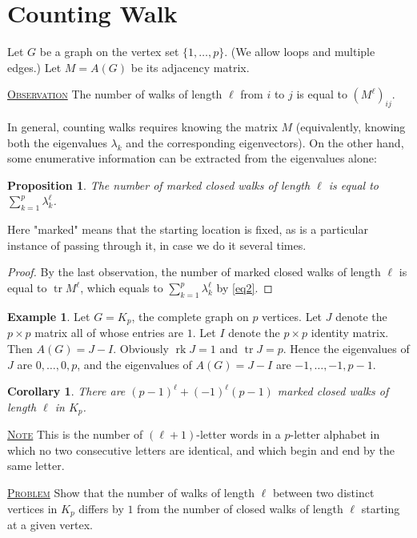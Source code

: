 \documentclass{report}
\def \tr {\operatorname{tr}}
\def \rk {\operatorname{rk}}
\newcommand{\fancyem}[1]{\underline{\textsc{#1}}}
\newtheorem{corollary}{Corollary}[section]
\newtheorem{proposition}{Proposition}[section]
\theoremstyle{definition}
\newtheorem{example}{Example}[section]
\theoremstyle{remark}
\numberwithin{equation}{section}
\begin{document}
\section{Counting Walk}
Let $G$ be a graph on the vertex set $\{1, \ldots, p\}$. (We allow loops and multiple edges.) Let $M = A(G)$ be its adjacency matrix.

\fancyem{Observation} The number of walks of length $\ell$ from $i$ to $j$ is equal to $(M^\ell)_{ij}$.

In general, counting walks requires knowing the matrix $M$ (equivalently, knowing both the eigenvalues $\lambda_k$ and the corresponding eigenvectors). On the other hand, some enumerative information can be extracted from the eigenvalues alone:

\begin{proposition}
The number of marked closed walks of length $\ell$ is equal to $\sum_{k=1}^p \lambda^\ell_k$.
\end{proposition}
Here "marked" means that the starting location is fixed, as is a particular instance
of passing through it, in case we do it several times.

\begin{proof}
By the last observation, the number of marked closed walks of length $\ell$ is equal to $\tr M^\ell$, which equals to $\sum_{k=1}^p \lambda^\ell_k$ by \eqref{eq2}.
\end{proof}

\begin{example}
Let $G = K_p$, the complete graph on $p$ vertices. Let $J$ denote the $p \times p$ matrix all of whose entries are $1$. Let $I$ denote the $p \times p$ identity matrix. Then $A(G) = J - I$. Obviously $\rk J = 1$ and $\tr J = p$. Hence the eigenvalues of $J$ are $0, \ldots, 0, p$, and the eigenvalues of $A(G) = J - I$ are $-1, \ldots, -1, p-1$.
\end{example}

\begin{corollary}
There are $(p-1)^\ell + (-1)^\ell(p-1)$ marked closed walks of length $\ell$ in $K_p$.
\end{corollary}

\fancyem{Note} This is the number of $(\ell+1)$-letter words in a $p$-letter alphabet in which no two consecutive letters are identical, and which begin and end by the same letter.



\fancyem{Problem} Show that the number of walks of length $\ell$ between two distinct vertices in $K_p$ differs by $1$ from the number of closed walks of length $\ell$ starting at a given vertex.
\end{document}

